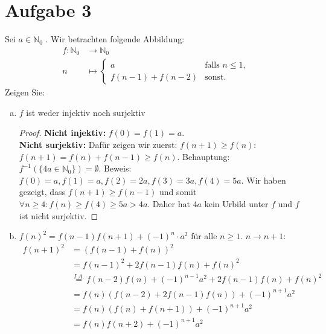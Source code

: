 \documentclass{article}
\begin{document}
	\section*{Aufgabe 3}
	Sei $a \in \mathbb{N}_0$ . Wir betrachten folgende Abbildung:
	\begin{align*}
		f : \mathbb{N}_0 &\to \mathbb{N}_0\\
		n &\mapsto
		\begin{cases}
		a & \text{falls $n\leq 1$, }\\
		f(n-1) + f(n-2) &\text{sonst.} 
		\end{cases}
	\end{align*}
	Zeigen Sie:
	\begin{enumerate}[a)]
		\item $f$ ist weder injektiv noch surjektiv
		\begin{proof}
			\textbf{Nicht injektiv:} $f(0) = f(1) = a$.\\
			\textbf{Nicht surjektiv:} Dafür zeigen wir zuerst: $f(n+1) \geq f(n)$: $f(n+1) = f(n) + f(n-1) \geq f(n)$.
			Behauptung: $f^{-1}(\{4a\in \mathbb{N}_0\}) = \emptyset$. Beweis: $f(0) = a, f(1) = a, f(2) = 2a, f(3) = 3a, f(4) = 5a$.
			Wir haben gezeigt, dass $f(n+1)\geq f(n-1)$ und somit $\forall n \geq 4: f(n) \geq f(4) \geq 5a > 4a$. Daher hat $4a$ kein Urbild unter $f$ und $f$ ist nicht surjektiv.
		\end{proof}
		\item  $f(n)^2 = f (n - 1)f(n + 1) + ( -1)^n\cdot a^2$ für alle $n\geq 1$.
		{$n\to n+1$: \begin{align*}
				f(n+1)^2 &= (f(n-1) + f(n))^2\\
				&= f(n-1)^2 + 2f(n-1)f(n) + f(n)^2\\
				&\overset{I.A.}{=} f(n-2)f(n) + (-1)^{n-1}a^2 + 2f(n-1)f(n) + f(n)^2\\
				&= f(n)(f(n-2) + 2f(n-1)f(n)) + (-1)^{n+1} a^2\\
				&= f(n)(f(n) + f(n+1)) + (-1)^{n+1} a^2 \\
				&= f(n)f(n+2) + (-1)^{n+1} a^2
		\end{align*}}
	\end{enumerate}
\end{document}
